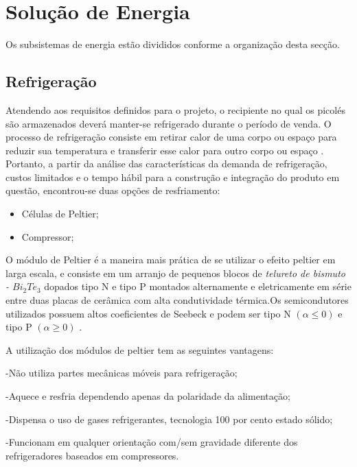 \section{Solução de Energia}

Os subsistemas de energia estão divididos conforme a organização desta secção. 

\subsection{Refrigeração}
Atendendo aos requisitos definidos para o projeto, o recipiente no qual os picolés são armazenados deverá manter-se refrigerado durante o período de venda. O processo de refrigeração consiste em retirar calor de uma corpo ou espaço para reduzir sua temperatura e transferir esse calor para outro corpo ou espaço \cite{campos2010refrigeraccao}. Portanto, a partir da análise das características da demanda de refrigeração, custos limitados e o tempo hábil para a construção e integração do produto em questão, encontrou-se duas opções de resfriamento:

\begin{itemize}
\item Células de Peltier;
\end{itemize}

\begin{itemize}
\item Compressor;
\end{itemize}


O módulo de Peltier é a maneira mais prática de se utilizar o efeito peltier em larga escala, e consiste em um arranjo de pequenos blocos de \textit{telureto de bismuto - $Bi_{2}Te_{3}$} dopados tipo N e tipo P montados alternamente e eletricamente em série entre duas placas de cerâmica com alta condutividade térmica.Os semicondutores utilizados possuem altos coeficientes de Seebeck e podem ser tipo N $(\alpha \leq 0)$ e tipo P $(\alpha \geq 0)$  \cite{campos2010refrigeraccao}.

A utilização dos módulos de peltier tem as seguintes vantagens:

-Não utiliza partes mecânicas móveis para refrigeração;

-Aquece e resfria dependendo apenas da polaridade da alimentação;

-Dispensa o uso de gases refrigerantes, tecnologia 100 por cento estado sólido;

-Funcionam em qualquer orientação com/sem gravidade diferente dos refrigeradores baseados em compressores.


